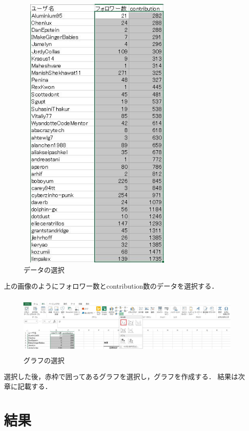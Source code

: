 \begin{figure}[htb]
\centering
\includegraphics[height=14cm,width=8cm]{sanpu2.JPG}
\caption{データの選択}\label{サンプル図}
\end{figure}
上の画像のようにフォロワー数とcontribution数のデータを選択する．

\newpage

\begin{figure}[htb]
\centering
\includegraphics[height=3cm,width=15cm]{sannpu3.JPG}
\caption{グラフの選択}\label{サンプル図}
\end{figure}
選択した後，赤枠で囲ってあるグラフを選択し，グラフを作成する．
結果は次章に記載する．

\chapter{結果}

